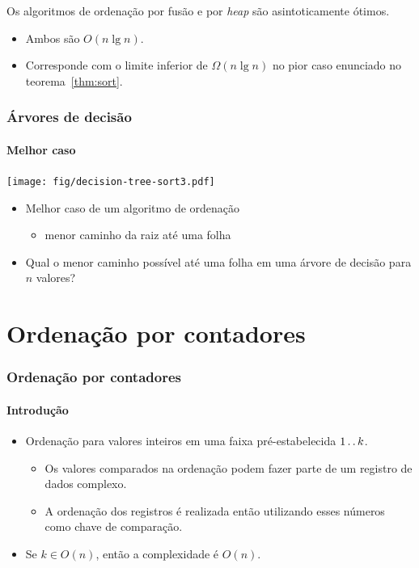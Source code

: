 \documentclass{beamer}
\begin{document}
\begin{frame}

\begin{corollary}
  Os algoritmos de ordenação por fusão e por \textit{heap\/} são asintoticamente
  ótimos.
\end{corollary}

\begin{itemize}
  \item Ambos são $O(n \lg n)$.
  \item Corresponde com o limite inferior de $\Omega(n \lg n)$ no pior caso enunciado no teorema~\ref{thm:sort}.
\end{itemize}

\end{frame}

\begin{frame}

  \frametitle{Árvores de decisão}
  \framesubtitle{Melhor caso}

  \begin{center}
    \texttt{[image: fig/decision-tree-sort3.pdf]}
  \end{center}

  \begin{itemize}
  \item Melhor caso de um algoritmo de ordenação 
    \pause
    \begin{itemize}
    \item menor caminho da raiz até uma folha
    \end{itemize}
    \pause
    \item \alert{Qual o menor caminho possível até uma folha em uma árvore de decisão para $n$ valores?}
  \end{itemize}

\end{frame}

\section{Ordenação por contadores} 

\begin{frame}

  \frametitle{Ordenação por contadores}
  \framesubtitle{Introdução}

  \begin{itemize}

    \item Ordenação para valores inteiros em uma faixa pré-estabelecida $1 \mathinner{\ldotp\ldotp} k$.
      \begin{itemize}
        \item Os valores comparados na ordenação podem fazer parte de um 
          registro de dados complexo.
        \item A ordenação dos registros é realizada então utilizando esses
          números como \alert{chave} de comparação.
      \end{itemize}
    \item Se $k \in O(n)$, então a complexidade é $O(n)$.
      
  \end{itemize}

\end{frame}
\end{document}
